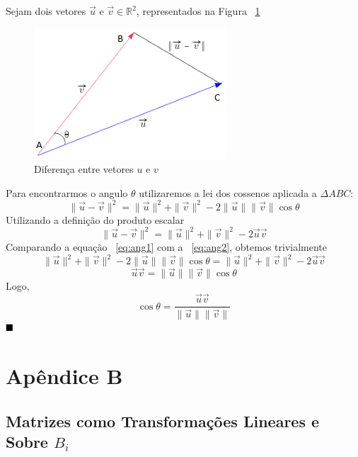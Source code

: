 \documentclass[a4paper,12pt]{article}
\begin{document}
\begin{itemize}
		Sejam dois vetores $\overrightarrow{u}$ e $\overrightarrow{v} \in \mathbb{R}^2$, representados na Figura ~\ref{fig:diffbtvet}
		\begin{figure}[H]
			\begin{center}
				\includegraphics[width=0.4\linewidth]{Angulovetoresnovo.png}
			\end{center}
			\caption{Diferença entre vetores $u$ e $v$}
			\label{fig:diffbtvet}
		\end{figure}
		Para encontrarmos o angulo $\theta$ utilizaremos a lei dos cossenos aplicada a $\Delta ABC$:
		\begin{equation}
		\|\overrightarrow{u}-\overrightarrow{v}\|^{2}=\|\overrightarrow{u}\|^{2} + \|\overrightarrow{v}\|^{2} - 2\|\overrightarrow{u}\|\|\overrightarrow{v}\|\cos\theta
		\label{eq:ang1}
		\end{equation}
		Utilizando a definição do produto escalar \cite{GASteinbruch}
		\begin{equation}
		\|\overrightarrow{u}-\overrightarrow{v}\|^{2}=\|\overrightarrow{u}\|^{2} + \|\overrightarrow{v}\|^{2} - 2\overrightarrow{u}\overrightarrow{v}
		\label{eq:ang2}
		\end{equation}
		Comparando a equação ~\ref{eq:ang1} com a ~\ref{eq:ang2}, obtemos trivialmente
		$$
		\|\overrightarrow{u}\|^{2} + \|\overrightarrow{v}\|^{2} - 2\|\overrightarrow{u}\|\|\overrightarrow{v}\|\cos\theta = \|\overrightarrow{u}\|^{2} + \|\overrightarrow{v}\|^{2} - 2\overrightarrow{u}\overrightarrow{v}
		$$
		$$
		\overrightarrow{u}\overrightarrow{v} = \|\overrightarrow{u}\|\|\overrightarrow{v}\|\cos\theta
		$$
		Logo,
		$$
		\cos\theta = \frac{\overrightarrow{u}\overrightarrow{v}}{\|\overrightarrow{u}\|\|\overrightarrow{v}\|} 
		$$
		$\hfill\blacksquare$
	\end{itemize}
	
	\newpage
	\section*{Apêndice B} 
	\subsection*{Matrizes como Transformações Lineares e Sobre $B_i$}
	
\end{document}

